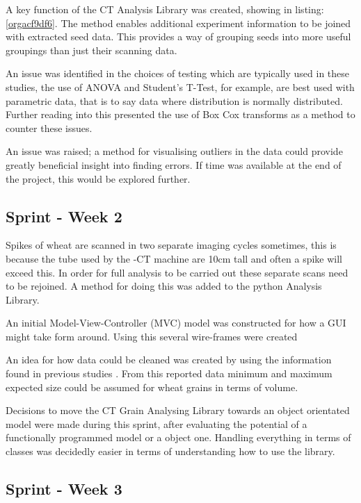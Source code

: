 \documentclass[11pt]{report}
\begin{document}
A key function of the CT Analysis Library was created, showing in listing:\ref{orgacf9df6}. The method enables additional experiment information to be joined with extracted seed data. This provides a way of grouping seeds into more useful groupings than just their scanning data.

An issue was identified in the choices of testing which are typically used in these studies, the use of ANOVA and Student's T-Test, for example, are best used with parametric data, that is to say data where distribution is normally distributed. Further reading into this presented the use of Box Cox transforms as a method to counter these issues.

An issue was raised; a method for visualising outliers in the data could provide greatly beneficial insight into finding errors. If time was available at the end of the project, this would be explored further.

\subsection{Sprint - Week 2}
\label{sec:orgeec1f82}

Spikes of wheat are scanned in two separate imaging cycles sometimes, this is because the tube used by the \textmu{}-CT machine are 10cm tall and often a spike will exceed this. In order for full analysis to be carried out these separate scans need to be rejoined. A method for doing this was added to the python Analysis Library.

An initial Model-View-Controller (MVC) model was constructed for how a GUI might take form around. Using this several wire-frames were created

An idea for how data could be cleaned was created by using the information found in previous studies \cite{Hughes2017}. From this reported data minimum and maximum expected size could be assumed for wheat grains in terms of volume.

Decisions to move the CT Grain Analysing Library towards an object orientated model were made during this sprint, after evaluating the potential of a functionally programmed model or a object one. Handling everything in terms of classes was decidedly easier in terms of understanding how to use the library.

\subsection{Sprint - Week 3}
\label{sec:orgb66cc84}
\end{document}
